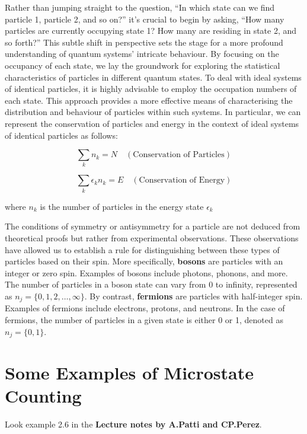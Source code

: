 \documentclass[12pt,a4paper]{report}
\newcommand{\esp}{\vspace{0.5cm}}
\begin{document}
	\esp
	
	Rather than jumping straight to the question, ``In which state can we find particle 1, particle 2, and so on?'' it's crucial to begin by asking, ``How many particles are currently occupying state 1? How many are residing in state 2, and so forth?'' This subtle shift in perspective sets the stage for a more profound understanding of quantum systems' intricate behaviour. By focusing on the occupancy of each state, we lay the groundwork for exploring the statistical characteristics of particles in different quantum states. To deal with ideal systems of identical particles, it is highly advisable to employ the occupation numbers of each state. This approach provides a more effective means of characterising the distribution and behaviour of particles within such systems. In particular, we can represent the conservation of particles and energy in the context of ideal systems of identical particles as follows:
	
	\esp
	
	\begin{equation}
		\sum_{k} n_k = N \quad (\text{Conservation of Particles})
	\end{equation}
	
	\esp
	
	\begin{equation}
		\sum_{k} \epsilon_k n_k = E \quad (\text{Conservation of Energy})
	\end{equation}
	
	\esp
	
	\noindent where $n_k$ is the number of particles in the energy state $\epsilon_k$
	
	\esp
	
	The conditions of symmetry or antisymmetry for a particle are not deduced from theoretical proofs but rather from experimental observations. These observations have allowed us to establish a rule for distinguishing between these types of particles based on their spin. More specifically, \textbf{bosons} are particles with an integer or zero spin. Examples of bosons include photons, phonons, and more. The number of particles in a boson state can vary from 0 to infinity, represented as $n_j = \{0, 1, 2, \dots, \infty\}$. By contrast, \textbf{fermions} are particles with half-integer spin. Examples of fermions include electrons, protons, and neutrons. In the case of fermions, the number of particles in a given state is either 0 or 1, denoted as $n_j = \{0, 1\}$.
	
	\section{Some Examples of Microstate Counting}
	
	\noindent Look example 2.6 in the \textbf{Lecture notes by A.Patti and CP.Perez}.
	
	
\end{document}
